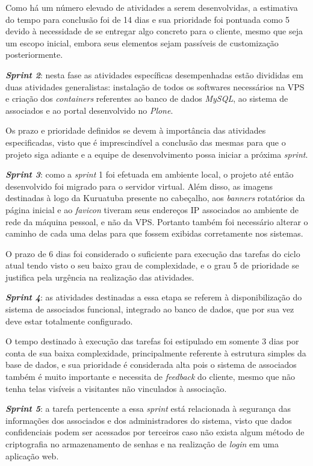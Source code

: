 Como há um número elevado de atividades a serem desenvolvidas, a estimativa do tempo para conclusão foi de 14 dias e sua prioridade foi pontuada como 5 devido à necessidade de se entregar algo concreto para o cliente, mesmo que seja um escopo inicial, embora seus elementos sejam passíveis de customização posteriormente. 

\textbf{\textit{Sprint 2}}: nesta fase as atividades específicas desempenhadas estão divididas em duas atividades generalistas: instalação de todos os softwares necessários na VPS e criação dos \textit{containers} referentes ao banco de dados \textit{MySQL}, ao sistema de associados e ao portal desenvolvido no \textit{Plone}. 

Os prazo e prioridade definidos se devem à importância das atividades especificadas, visto que é imprescindível a conclusão das mesmas para que o projeto siga adiante e a equipe de desenvolvimento possa iniciar a próxima \textit{sprint}. 

\textbf{\textit{Sprint 3}}: como a \textit{sprint} 1 foi efetuada em ambiente local, o projeto até então desenvolvido foi migrado para o servidor virtual. Além disso, as imagens destinadas à logo da Kuruatuba presente no cabeçalho, aos \textit{banners} rotatórios da página inicial e ao \textit{favicon} tiveram seus endereços IP associados ao ambiente de rede da máquina pessoal, e não da VPS. Portanto também foi necessário alterar o caminho de cada uma delas para que fossem exibidas corretamente nos sistemas.

O prazo de 6 dias foi considerado o suficiente para execução das tarefas do ciclo atual tendo visto o seu baixo grau de complexidade, e o grau 5 de prioridade se justifica pela urgência na realização das atividades. 

\textbf{\textit{Sprint 4}}: as atividades destinadas a essa etapa se referem à disponibilização do sistema de associados funcional, integrado ao banco de dados, que por sua vez deve estar totalmente configurado. 

O tempo destinado à execução das tarefas foi estipulado em somente 3 dias por conta de sua baixa complexidade, principalmente referente à estrutura simples da base de dados, e sua prioridade é considerada alta pois o sistema de associados também é muito importante e necessita de \textit{feedback} do cliente, mesmo que não tenha telas visíveis a visitantes não vinculados à associação. 

\textbf{\textit{Sprint 5}}: a tarefa pertencente a essa \textit{sprint} está relacionada à segurança das informações dos associados e dos administradores do sistema, visto que dados confidenciais podem ser acessados por terceiros caso não exista algum método de criptografia no armazenamento de senhas e na realização de \textit{login} em uma aplicação web.


